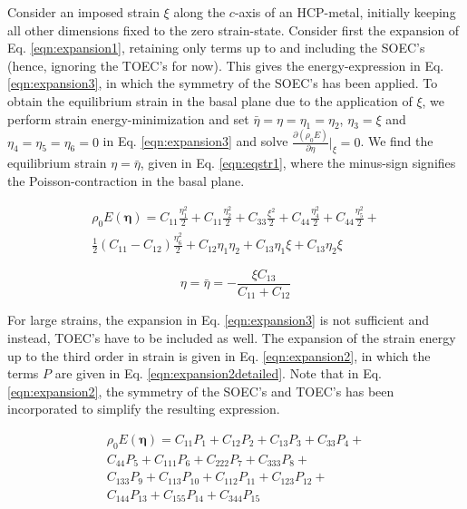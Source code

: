 \documentclass[showpacs,aps,floatfix,prb,reprint,superscriptaddress]{revtex4-1}
\begin{document}
Consider an imposed strain $\xi$ along the $c$-axis of an HCP-metal, initially keeping all other dimensions fixed to the zero strain-state. Consider first the expansion of Eq. \ref{eqn:expansion1}, retaining only terms up to and including the SOEC's (hence, ignoring the TOEC's for now). This gives the energy-expression in Eq. \ref{eqn:expansion3}, in which the symmetry of the SOEC's has been applied. To obtain the equilibrium strain in the basal plane due to the application of $\xi$, we perform strain energy-minimization and set $\bar{\eta} = \eta = \eta_{1} = \eta_{2}$, $\eta_{3} = \xi$ and $\eta_{4} = \eta_{5} = \eta_{6} = 0$ in Eq. \ref{eqn:expansion3} and solve $\frac{\partial \left(\rho_{0} E\right)}{\partial \eta}|_{\xi} = 0$. We find the equilibrium strain $\eta = \bar{\eta}$, given in Eq. \ref{eqn:eqstr1}, where the minus-sign signifies the Poisson-contraction in the basal plane.

\begin{multline}
\label{eqn:expansion3} 
\rho_{0} E \left(\bm{\eta}\right) = C_{11}\frac{\eta_{1}^2}{2} + C_{11}\frac{\eta_{2}^2}{2} +  C_{33}\frac{\xi^2}{2} + C_{44}\frac{\eta_{4}^2}{2} + C_{44}\frac{\eta_{5}^2}{2} + \\  \frac{1}{2} \left(C_{11}-C_{12}\right)\frac{\eta_{6}^2}{2} + C_{12}\eta_{1}\eta_{2} + C_{13}\eta_{1}\xi + C_{13}\eta_{2}\xi
\end{multline}

\begin{equation}
\label{eqn:eqstr1} 
\eta = \bar{\eta} = -\frac{\xi C_{13}}{C_{11} + C_{12}}
\end{equation}

For large strains, the expansion in Eq. \ref{eqn:expansion3} is not sufficient and instead, TOEC's have to be included as well. The expansion of the strain energy up to the third order in strain is given in Eq. \ref{eqn:expansion2}, in which the terms $P$ are given in Eq. \ref{eqn:expansion2detailed}. Note that in Eq. \ref{eqn:expansion2}, the symmetry of the SOEC's and TOEC's has been incorporated to simplify the resulting expression. 

\begin{multline}
\label{eqn:expansion2} 
\rho_{0} E \left(\bm{\eta}\right) = C_{11} P_{1} +  C_{12} P_{2} + C_{13} P_{3} + C_{33} P_{4} + \\ C_{44} P_{5} + C_{111} P_{6} + C_{222} P_{7} + C_{333} P_{8} + \\ C_{133} P_{9} +  C_{113} P_{10} + C_{112} P_{11} + C_{123} P_{12} + \\ C_{144} P_{13} + C_{155} P_{14} + C_{344} P_{15}
\end{multline}
\end{document}
